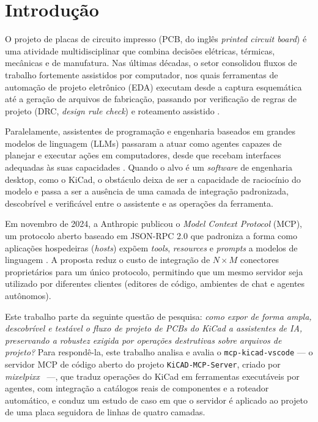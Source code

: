 \section{Introdução}\label{sec:introducao}

O projeto de placas de circuito impresso (PCB, do inglês \emph{printed circuit
board}) é uma atividade multidisciplinar que combina decisões elétricas,
térmicas, mecânicas e de manufatura. Nas últimas décadas, o setor consolidou
fluxos de trabalho fortemente assistidos por computador, nos quais ferramentas
de automação de projeto eletrônico (EDA) executam desde a captura esquemática
até a geração de arquivos de fabricação, passando por verificação de regras de
projeto (DRC, \emph{design rule check}) e roteamento assistido
\citep{kicaddocs,horowitz2015}.

Paralelamente, assistentes de programação e engenharia baseados em grandes
modelos de linguagem (LLMs) passaram a atuar como agentes capazes de planejar e
executar ações em computadores, desde que recebam interfaces adequadas às suas
capacidades \citep{yao2023react,yang2024sweagent}. Quando o alvo é um
\emph{software} de engenharia desktop, como o KiCad, o obstáculo deixa de ser a
capacidade de raciocínio do modelo e passa a ser a ausência de uma camada de
integração padronizada, descobrível e verificável entre o assistente e as
operações da ferramenta.

Em novembro de 2024, a Anthropic publicou o \emph{Model Context Protocol} (MCP),
um protocolo aberto baseado em JSON-RPC 2.0 que padroniza a forma como
aplicações hospedeiras (\emph{hosts}) expõem \emph{tools}, \emph{resources} e
\emph{prompts} a modelos de linguagem \citep{anthropic2024mcp,mcp2025spec}. A
proposta reduz o custo de integração de $N \times M$ conectores proprietários
para um único protocolo, permitindo que um mesmo servidor seja utilizado por
diferentes clientes (editores de código, ambientes de chat e agentes
autônomos).

Este trabalho parte da seguinte questão de pesquisa: \emph{como expor de forma
ampla, descobrível e testável o fluxo de projeto de PCBs do KiCad a assistentes
de IA, preservando a robustez exigida por operações destrutivas sobre arquivos
de projeto?} Para respondê-la, este trabalho analisa e avalia o
\texttt{mcp-kicad-vscode} --- o servidor MCP de código aberto do projeto
\texttt{KiCAD-MCP-Server}, criado por \emph{mixelpixx}~\citep{kicadmcpserver}
---, que traduz operações do KiCad em ferramentas executáveis por agentes, com
integração a catálogos reais de componentes e a roteador automático, e conduz
um estudo de caso em que o servidor é aplicado ao projeto de uma placa
seguidora de linhas de quatro camadas.

